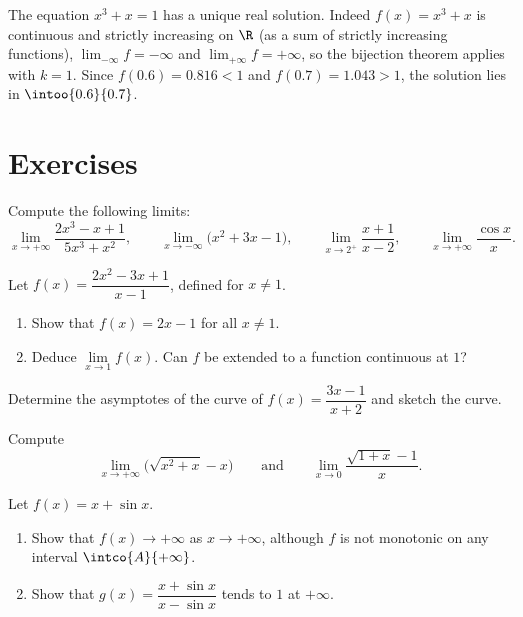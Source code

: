 \begin{example}\label{ex:tle:limcont:cubic}
The equation $x^3 + x = 1$ has a unique real solution. Indeed
$f(x) = x^3 + x$ is continuous and strictly increasing on $\R$ (as a sum of
strictly increasing functions), $\lim_{-\infty} f = -\infty$ and
$\lim_{+\infty} f = +\infty$, so the bijection theorem applies with $k = 1$.
Since $f(0.6) = 0.816 < 1$ and $f(0.7) = 1.043 > 1$, the solution lies in
$\intoo{0.6}{0.7}$.
\end{example}

\section{Exercises}

\begin{exercise}[$\star$]\label{exo:tle:limcont:1}
Compute the following limits:
\[
\lim_{x\to+\infty} \frac{2x^3 - x + 1}{5x^3 + x^2}, \qquad
\lim_{x\to-\infty} \bigl(x^2 + 3x - 1\bigr), \qquad
\lim_{x\to 2^+} \frac{x+1}{x-2}, \qquad
\lim_{x\to+\infty} \frac{\cos x}{x}.
\]
\end{exercise}

\begin{exercise}[$\star$]\label{exo:tle:limcont:2}
Let $f(x) = \dfrac{2x^2 - 3x + 1}{x - 1}$, defined for $x \neq 1$.
\begin{enumerate}
  \item Show that $f(x) = 2x - 1$ for all $x \neq 1$.
  \item Deduce $\lim\limits_{x \to 1} f(x)$. Can $f$ be extended to a
        function continuous at $1$?
\end{enumerate}
\end{exercise}

\begin{exercise}[$\star$]\label{exo:tle:limcont:3}
Determine the asymptotes of the curve of
$f(x) = \dfrac{3x - 1}{x + 2}$ and sketch the curve.
\end{exercise}

\begin{exercise}[$\star\star$]\label{exo:tle:limcont:4}
Compute
\[
\lim_{x\to+\infty} \bigl(\sqrt{x^2 + x} - x\bigr)
\qquad\text{and}\qquad
\lim_{x\to 0} \frac{\sqrt{1+x} - 1}{x}.
\]
\end{exercise}

\begin{exercise}[$\star\star$]\label{exo:tle:limcont:5}
Let $f(x) = x + \sin x$.
\begin{enumerate}
  \item Show that $f(x) \to +\infty$ as $x \to +\infty$, although $f$ is not
        monotonic on any interval $\intco{A}{+\infty}$.
  \item Show that $g(x) = \dfrac{x + \sin x}{x - \sin x}$ tends to $1$ at
        $+\infty$.
\end{enumerate}
\end{exercise}


